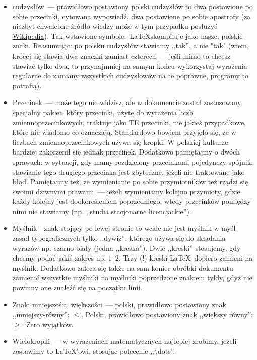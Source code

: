 \begin{itemize}
	\item cudzysłów~--- prawidłowo postawiony polski cudzysłów to dwa postawione po sobie przecinki, cytowana wypowiedź, dwa postawione po sobie apostrofy (za niezbyt chwalebne źródło wiedzy może w tym przypadku posłużyć \href{https://en.wikipedia.org/wiki/Quotation_mark}{Wikipedia}). Tak wstawione symbole,~\LaTeX skompiluje jako nasze, polskie znaki.
	Reasumując: po polsku cudzysłów stawiamy ,,tak'', a nie "tak" (wiem, krócej się stawia dwa znaczki zamiast czterech~--- jeśli mimo to chcesz stawiać tylko dwa, to przynajmniej na samym końcu wykorzystaj wyrażenia regularne do zamiany wszystkich cudzysłowów na te poprawne, programy to potrafią).
	\item Przecinek~--- może tego nie widzisz, ale w dokumencie został zastosowany specjalny pakiet, który przecinki, użyte do wyrażenia liczb zmiennoprzecinkowych, traktuje jako TE przecinki, nie jakieś przypadkowe, które nie wiadomo co oznaczają.
	Standardowo bowiem przyjęło się, że w liczbach zmiennoprzecinkowych używa się kropki.
	W polskiej kulturze bardziej zakorzenił się jednak przecinek.
	Dodatkowo pamiętajmy o dwóch sprawach: w sytuacji, gdy mamy rozdzielony przecinkami pojedynczy spójnik, stawianie tego drugiego przecinka jest zbyteczne, jeżeli nie traktowane jako błąd.
	Pamiętajmy też, że wymienianie po sobie przymiotników też rządzi się swoimi dziwnymi prawami~--- jeżeli wymieniamy kolejno przymioty, gdzie każdy kolejny jest dookoreśleniem poprzedniego, wtedy przecinków pomiędzy nimi nie stawiamy (np. ,,studia stacjonarne licencjackie'').
	\item Myślnik - znak stojący po lewej stronie to wcale nie jest myślnik w myśl zasad typograficznych tylko ,,dywiz'', którego używa się do składania wyrazów np. czarno-biały (jedna ,,kreska'').
	Dwie ,,kreski'' stosujemy, gdy chcemy podać jakiś zakres np. $1$--$2$.
	Trzy (!) kreski \LaTeX~dopiero zamieni na myślnik.
	Dodatkowo zaleca się także na sam koniec obróbki dokumentu zamienić wszystkie myślniki na myślniki poprzedzone znakiem tyldy, gdyż nie powinny one znaleźć się na początku linii.
	\item Znaki mniejszości, większości~--- polski, prawidłowo postawiony znak ,,mniejszy-równy'': $\leqslant$.
	Polski, prawidłowo postawiony znak ,,większy równy'': $\geqslant$.
	Zero wyjątków.
	\item Wielokropki~--- w wyrażeniach matematycznych najlepiej zrobimy, jeżeli zostawimy to \LaTeX'owi, stosując polecenie ,,\textbackslash dots''.

\end{itemize}
